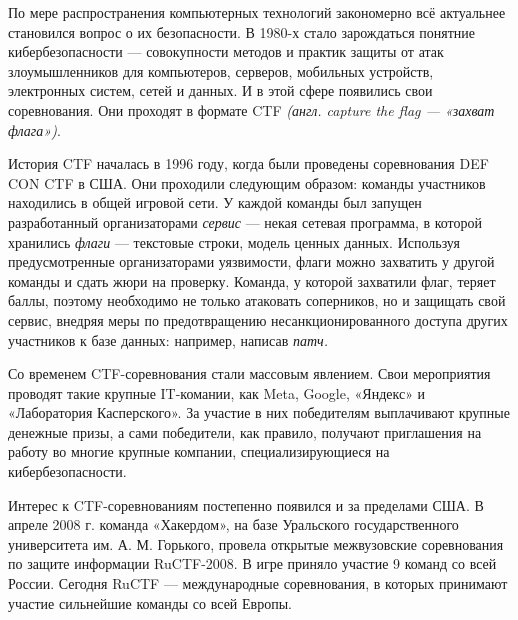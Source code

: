 По мере распространения компьютерных технологий закономерно всё актуальнее становился вопрос о их безопасности. В 1980-х стало зарождаться понятние кибербезопасности --- совокупности методов и практик защиты от атак злоумышленников для компьютеров, серверов, мобильных устройств, электронных систем, сетей и данных. И в этой сфере появились свои соревнования. Они проходят в формате CTF \textit{(англ. capture the flag --- «захват флага»)}.



История CTF началась в 1996 году, когда были проведены соревнования DEF CON CTF в США\cite{Defcon}. Они проходили следующим образом: команды участников находились в общей игровой сети. У каждой команды был запущен разработанный организаторами \textit{сервис} — некая сетевая программа, в которой хранились \textit{флаги} — текстовые строки, модель ценных данных. Используя предусмотренные организаторами уязвимости, флаги можно захватить у другой команды и сдать жюри на проверку. Команда, у которой захватили флаг, теряет баллы, поэтому необходимо не только атаковать соперников, но и защищать свой сервис, внедряя меры по предотвращению несанкционированного доступа других участников к базе данных: например, написав \textit{патч.}


Со временем CTF-соревнования стали массовым явлением. Свои мероприятия проводят такие крупные IT-комании, как Meta\cite{FBCTF}, Google\cite{GoogleCTF}, «Яндекс»\cite{YaCTF} и «Лаборатория Касперского»\cite{KasperskyCTF}. За участие в них победителям выплачивают крупные денежные призы, а сами победители, как правило, получают приглашения на работу во многие крупные компании, специализирующиеся на кибербезопасности.

Интерес к CTF-соревнованиям постепенно появился и за пределами США. В апреле 2008 г. команда «Хакердом», на базе Уральского государственного университета им. А. М. Горького, провела открытые межвузовские соревнования по защите информации RuCTF-2008. В игре приняло участие 9 команд со всей России\cite{Hackerdom08}. Сегодня RuCTF --- международные соревнования, в которых принимают участие сильнейшие команды со всей Европы\cite{Hackerdom20}.

